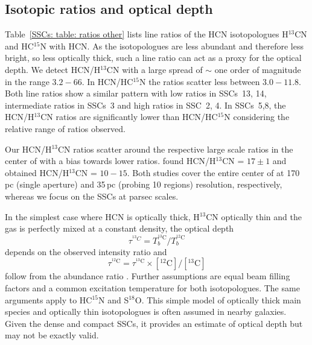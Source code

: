 
\subsection{Isotopic ratios and optical depth}\label{SSCs: section: optical depth}

Table~\ref{SSCs: table: ratios other} lists line ratios of the HCN isotopologues H$^{13}$CN and HC$^{15}$N with HCN. As the isotopologues are less abundant and therefore less bright, so less optically thick, such a line ratio can act as a proxy for the optical depth. 
We detect HCN/H$^{13}$CN with a large spread of $\sim$ one order of magnitude in the range $3.2-66$.
In HCN/HC$^{15}$N the ratios scatter less between $3.0-11.8$. 
Both line ratios show a similar pattern with low ratios in SSCs~13, 14, intermediate ratios in SSCs~3 and high ratios in SSC~2, 4. In SSCs~5,8, the HCN/H$^{13}$CN ratios are significantly lower than HCN/HC$^{15}$N considering the relative range of ratios observed.

Our HCN/H$^{13}$CN ratios scatter around the respective large scale ratios in the center of  with a bias towards lower ratios. \citet{JimenezDonaire:2017eg} found HCN/H$^{13}$CN = $17 \pm 1$ and \citet{2015ApJ...801...63M} obtained HCN/H$^{13}$CN = $10-15$. Both studies cover the entire center of  at 170\,pc (single aperture) and 35\,pc (probing 10 regions) resolution, respectively, whereas we focus on the SSCs at parsec scales.

In the simplest case where HCN is optically thick, H$^{13}$CN optically thin and the gas is perfectly mixed at a constant density, the optical depth
\begin{equation}
    \tau^{^{13}C} = T_b^{^{13}\mathrm{C}}/T_b^{^{12}\mathrm{C}}
    \label{equation: tau thin}
\end{equation}
depends on the observed intensity ratio and 
\begin{equation}
    \tau^{^{12}\mathrm{C}} = \tau^{^{13}\mathrm{C}} \times [^{12}\mathrm{C}]/[^{13}\mathrm{C}]
    \label{equation: tau thick}
\end{equation}
follow from the abundance ratio \citep[e.g.,][]{JimenezDonaire:2017eg}. Further assumptions are equal beam filling factors and a common excitation temperature for both isotopologues. The same arguments apply to HC$^{15}$N and S$^{18}$O. This simple model of optically thick main species and optically thin isotopologues is often assumed in nearby galaxies. Given the dense and compact SSCs, it provides an estimate of optical depth but may not be exactly valid.

